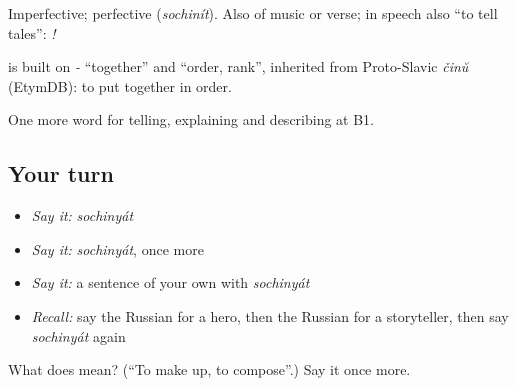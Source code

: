 Imperfective; perfective \emph{} (\emph{sochinít}). Also of music or verse; in speech also \textquotedblleft{}to tell tales\textquotedblright{}: \emph{ !}

\begin{cousinweb}
\emph{} is built on \emph{-} \textquotedblleft{}together\textquotedblright{} and \emph{} \textquotedblleft{}order, rank\textquotedblright{}, inherited from Proto-Slavic \emph{činŭ} (EtymDB): to put together in order.
\end{cousinweb}

\begin{grammarlens}[title={What you've built}]
One more word for telling, explaining and describing at B1.
\end{grammarlens}

\subsection*{Your turn}
\begin{itemize}
\raggedright
  \item \emph{Say it:} \emph{sochinyát}
  \item \emph{Say it:} \emph{sochinyát}, once more
  \item \emph{Say it:} a sentence of your own with \emph{sochinyát}
  \item \emph{Recall:} say the Russian for a hero, then the Russian for a storyteller, then say \emph{sochinyát} again
\end{itemize}

\begin{tcolorbox}[breakable,colback=teal!4,colframe=teal!35!black,title={Before you move on}]
What does  mean? (\textquotedblleft{}To make up, to compose\textquotedblright{}.) Say it once more.
\end{tcolorbox}
